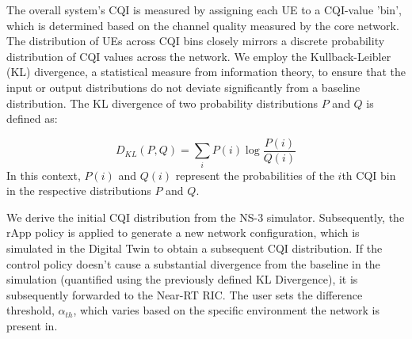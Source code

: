 The overall system's CQI is measured by assigning each UE to a CQI-value 'bin', which is determined based on the channel quality measured by the core network.
The distribution of UEs across CQI bins closely mirrors a discrete probability distribution of CQI values across the network.
We employ the Kullback-Leibler (KL) divergence, a statistical measure from information theory, to ensure that the input or output distributions do not deviate significantly from a baseline distribution.
The KL divergence of two probability distributions $P$ and $Q$ is defined as:

\begin{equation}
D_{KL}(P, Q) = \sum_{i} P(i) \log \frac{P(i)}{Q(i)}
\end{equation}
\noindent In this context, $P(i)$ and $Q(i)$ represent the probabilities of the $i$th CQI bin in the respective distributions $P$ and $Q$.

We derive the initial CQI distribution from the NS-3 simulator. 
Subsequently, the rApp policy is applied to generate a new network configuration, which is simulated in the Digital Twin to obtain a subsequent CQI distribution. 
If the control policy doesn't cause a substantial divergence from the baseline in the simulation (quantified using the previously defined KL Divergence), it is subsequently forwarded to the Near-RT RIC.
The user sets the difference threshold, $\alpha_{th}$, which varies based on the specific environment the network is present in.